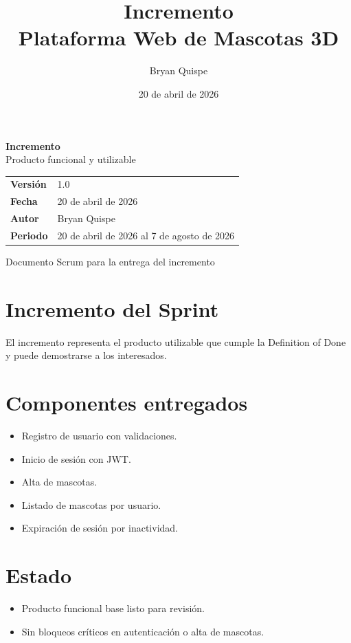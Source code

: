 \documentclass[12pt,a4paper]{article}
\title{\Huge\textbf{Incremento}\\[0.3em]\Large Plataforma Web de Mascotas 3D}
\author{Bryan Quispe}
\date{20 de abril de 2026}
\begin{document}
\begin{titlepage}
\centering
\vspace*{1.8cm}
{\Huge\bfseries\color{PrimaryBlue} Incremento\\[0.35em]}
{\LARGE Producto funcional y utilizable\\[1.2cm]}

\begin{tabular}{p{5cm} p{8cm}}
\rowcolor{SoftGray}
\textbf{Versión} & 1.0 \\
\textbf{Fecha} & 20 de abril de 2026 \\
\textbf{Autor} & Bryan Quispe \\
\textbf{Periodo} & 20 de abril de 2026 al 7 de agosto de 2026 \\
\end{tabular}

\vfill
{\large Documento Scrum para la entrega del incremento}
\end{titlepage}

\section{Incremento del Sprint}
El incremento representa el producto utilizable que cumple la Definition of Done y puede demostrarse a los interesados.

\section{Componentes entregados}
\begin{itemize}[leftmargin=*]
    \item Registro de usuario con validaciones.
    \item Inicio de sesión con JWT.
    \item Alta de mascotas.
    \item Listado de mascotas por usuario.
    \item Expiración de sesión por inactividad.
\end{itemize}

\section{Estado}
\begin{itemize}[leftmargin=*]
    \item Producto funcional base listo para revisión.
    \item Sin bloqueos críticos en autenticación o alta de mascotas.
\end{itemize}
\end{document}

